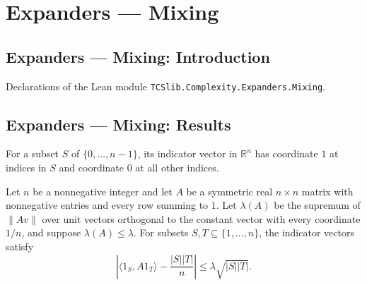 \section{Expanders --- Mixing}
\subsection*{Expanders --- Mixing: Introduction}

Declarations of the Lean module \texttt{TCSlib.Complexity.Expanders.Mixing}.

\subsection*{Expanders --- Mixing: Results}

\begin{definition}
\label{Expander.indicator}
\leanok
For a subset $S$ of $\{0,\ldots,n-1\}$, its indicator vector in $\mathbb R^n$ has
coordinate $1$ at indices in $S$ and coordinate $0$ at all other indices.
\end{definition}

\begin{theorem}
\label{Expander.inner_indicator_mulVec_le}
\leanok
{}
Let $n$ be a nonnegative integer and let $A$ be a symmetric real $n\times n$ matrix with
nonnegative entries and every row summing to $1$. Let $\lambda(A)$ be the supremum of
$\|Av\|$ over unit vectors orthogonal to the constant vector with every coordinate
$1/n$, and suppose $\lambda(A)\leq\lambda$. For subsets $S,T\subseteq\{1,\ldots,n\}$,
the indicator vectors satisfy
\[\left|\langle 1_S,A1_T\rangle-\frac{|S||T|}{n}\right|\leq \lambda\sqrt{|S||T|}.\]
\end{theorem}
